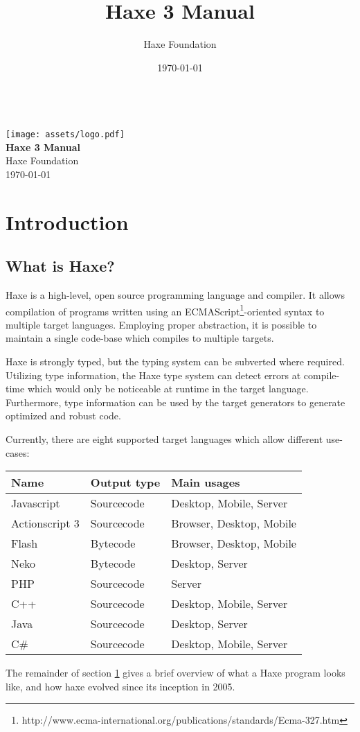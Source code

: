 \documentclass{haxe}
\renewcommand{\maketitle}{
   \begin{titlepage}
     \setcounter{page}{-1}
			\begin{center}
				~\\[3cm]
				\texttt{[image: assets/logo.pdf]}~\\[1cm]
				{\huge \bfseries Haxe 3 Manual}\\[7cm]
				Haxe Foundation\\
				\today
			\end{center}
   \end{titlepage}
}
\begin{document}
\title{Haxe 3 Manual}
\author{Haxe Foundation}
\date{\today}
\maketitle


\clearpage
\todototoc
\listoftodos
\clearpage

\clearpage
\tableofcontents
\clearpage

\chapter{Introduction}
\label{introduction}

\section{What is Haxe?}
\label{introduction-what-is-haxe}

Haxe is a high-level, open source programming language and compiler. It allows compilation of programs written using an ECMAScript\footnote{http://www.ecma-international.org/publications/standards/Ecma-327.htm}-oriented syntax to multiple target languages. Employing proper abstraction, it is possible to maintain a single code-base which compiles to multiple targets.

Haxe is strongly typed, but the typing system can be subverted where required. Utilizing type information, the Haxe type system can detect errors at compile-time which would only be noticeable at runtime in the target language. Furthermore, type information can be used by the target generators to generate optimized and robust code.

Currently, there are eight supported target languages which allow different use-cases:

\begin{center}
\begin{tabular}{| l | l | l |}
	\hline
	Name & Output type & Main usages \\ \hline
	Javascript & Sourcecode & Desktop, Mobile, Server \\
	Actionscript 3 & Sourcecode & Browser, Desktop, Mobile \\
	Flash & Bytecode & Browser, Desktop, Mobile \\ 
	Neko & Bytecode & Desktop, Server \\
	PHP & Sourcecode & Server \\
	C++ & Sourcecode & Desktop, Mobile, Server \\
	Java & Sourcecode & Desktop, Server \\
	C\# & Sourcecode & Desktop, Mobile, Server \\ \hline
\end{tabular}
\end{center}
The remainder of section \ref{introduction} gives a brief overview of what a Haxe program looks like, and how haxe evolved since its inception in 2005.
\end{document}
